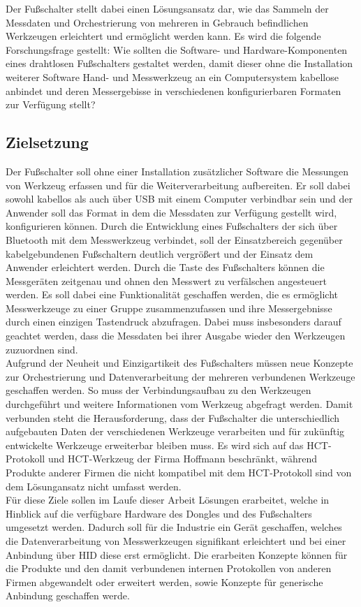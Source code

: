 Der Fußschalter stellt dabei einen Lösungsansatz dar, wie das Sammeln der Messdaten und Orchestrierung von mehreren in Gebrauch befindlichen Werkzeugen erleichtert und ermöglicht werden kann. Es wird die folgende Forschungsfrage gestellt: Wie sollten die Software- und Hardware-Komponenten eines drahtlosen Fußschalters gestaltet werden, damit dieser ohne die Installation weiterer Software Hand- und Messwerkzeug an ein Computersystem kabellose anbindet und deren Messergebisse in verschiedenen konfigurierbaren Formaten zur Verfügung stellt?

\subsection{Zielsetzung}
Der Fußschalter soll ohne einer Installation zusätzlicher Software die Messungen von Werkzeug erfassen und für die Weiterverarbeitung aufbereiten. Er soll dabei sowohl kabellos als auch über USB mit einem Computer verbindbar sein und der Anwender soll das Format in dem die Messdaten zur Verfügung gestellt wird, konfigurieren können. Durch die Entwicklung eines Fußschalters der sich über Bluetooth mit dem Messwerkzeug verbindet, soll der Einsatzbereich gegenüber kabelgebundenen Fußschaltern deutlich vergrößert und der Einsatz dem Anwender erleichtert werden. Durch die Taste des Fußschalters können die Messgeräten zeitgenau und ohnen den Messwert zu verfälschen angesteuert werden. Es soll dabei eine Funktionalität geschaffen werden, die es ermöglicht Messwerkzeuge zu einer Gruppe zusammenzufassen und ihre Messergebnisse durch einen einzigen Tastendruck abzufragen. Dabei muss insbesonders darauf geachtet werden, dass die Messdaten bei ihrer Ausgabe wieder den Werkzeugen zuzuordnen sind.\\
Aufgrund der Neuheit und Einzigartikeit des Fußschalters müssen neue Konzepte zur Orchestrierung und Datenverarbeitung der mehreren verbundenen Werkzeuge geschaffen werden. So muss der Verbindungsaufbau zu den Werkzeugen durchgeführt und weitere Informationen vom Werkzeug abgefragt werden. Damit verbunden steht die Herausforderung, dass der Fußschalter die unterschiedlich aufgebauten Daten der verschiedenen Werkzeuge verarbeiten und für zukünftig entwickelte Werkzeuge erweiterbar bleiben muss. Es wird sich auf das \ac{HCT}-Protokoll und \ac{HCT}-Werkzeug der Firma Hoffmann beschränkt, während Produkte anderer Firmen die nicht kompatibel mit dem \ac{HCT}-Protokoll sind von dem Lösungansatz nicht umfasst werden.\\
Für diese Ziele sollen im Laufe dieser Arbeit Lösungen erarbeitet, welche in Hinblick auf die verfügbare Hardware des Dongles und des Fußschalters umgesetzt werden. Dadurch soll für die Industrie ein Gerät geschaffen, welches die Datenverarbeitung von Messwerkzeugen signifikant erleichtert und bei einer Anbindung über \ac{HID} diese erst ermöglicht. Die erarbeiten Konzepte können für die Produkte und den damit verbundenen internen Protokollen von anderen Firmen abgewandelt oder erweitert werden, sowie Konzepte für generische Anbindung geschaffen werde.

